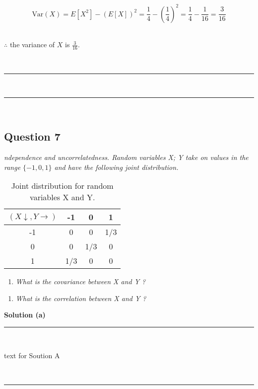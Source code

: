 \documentclass{article}
\begin{document}
$$\text{Var}(X) = E[X^2] - (E[X])^2 = \frac{1}{4} - (\frac{1}{4})^2 = \frac{1}{4} - \frac{1}{16} = \frac{3}{16}$$\\

\parbox{\textwidth}{$\therefore$ the variance of $X$ is $\frac{3}{16}$.}\\

\noindent\rule{\textwidth}{0.4pt}\\
\noindent\rule{\textwidth}{0.4pt}\\

\newpage

\subsection*{Question 7}
\textit{ndependence and uncorrelatedness. Random variables X; Y take on values in the range $\{-1,0,1\}$ and have the following joint distribution.}\\

\begin{table}[h]
\centering
\begin{tabular}{c|ccc}
  $(X\downarrow ,Y \rightarrow)$ & -1 & 0 & 1 \\ \hline
-1 & 0 & 0 & 1/3 \\
 0 & 0 & 1/3 & 0 \\
 1 & 1/3 & 0 & 0 \\
\end{tabular}
\caption{Joint distribution for random variables X and Y.}
\label{tab:example_fractions}
\end{table}

\begin{enumerate}[label=(a)]
  \item \textit{What is the covariance between X and Y ?}
\end{enumerate}

\begin{enumerate}[label=(b)]
  \item \textit{What is the correlation between X and Y ?}
\end{enumerate}

\textbf{Solution (a)}

\noindent\rule{\textwidth}{0.4pt}\\

\parbox{\textwidth}{text for Soution A}\\

\noindent\rule{\textwidth}{0.4pt}\\
\end{document}
